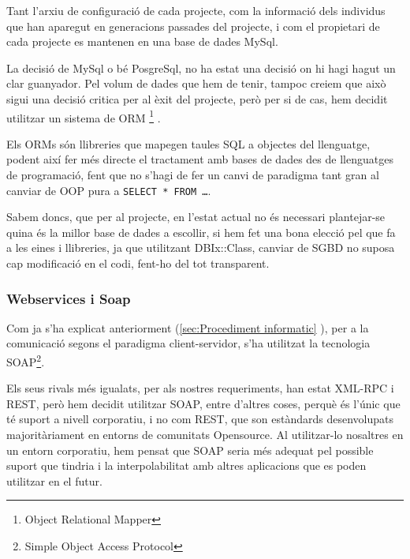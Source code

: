 Tant l'arxiu de configuració de cada projecte, com la informació dels individus
que han aparegut en generacions passades del projecte, i com el propietari de
cada projecte es mantenen en una base de dades MySql.

La decisió de MySql o bé PosgreSql, no ha estat una decisió on hi hagi hagut un
clar guanyador.  Pel volum de dades que hem de tenir, tampoc creiem que això
sigui una decisió critica per al èxit del projecte, però per si de cas, hem
decidit utilitzar un sistema de ORM \footnote{Object Relational Mapper} .

Els ORMs són llibreries que mapegen taules SQL a objectes del llenguatge, podent
així fer més directe el tractament amb bases de dades des de llenguatges de
programació, fent que no s'hagi de fer un canvi de paradigma tant gran al
canviar de OOP pura a \texttt{SELECT * FROM \ldots}.

Sabem doncs, que per al projecte, en l'estat actual no és necessari plantejar-se
quina és la millor base de dades a escollir, si hem fet una bona elecció pel
que fa a les eines i llibreries, ja que utilitzant DBIx::Class, canviar de SGBD no
suposa cap modificació en el codi, fent-ho del tot transparent.


\subsubsection{Webservices i Soap} %
\label{ssub:WS i Soap}

Com ja s'ha explicat anteriorment (\ref{sec:Procediment informatic} ), per a la
comunicació segons el paradigma client-servidor, s'ha utilitzat la tecnologia
SOAP\footnote{Simple Object Access Protocol}.

Els seus rivals més igualats, per als nostres requeriments, han estat XML-RPC i
REST, però hem decidit utilitzar SOAP, entre d'altres coses, perquè és l'únic
que té suport a nivell corporatiu, i no com REST, que son estàndards
desenvolupats majoritàriament en entorns de comunitats Opensource.  Al
utilitzar-lo nosaltres en un entorn corporatiu, hem pensat que SOAP seria més
adequat pel possible suport que tindria i la interpolabilitat amb altres
aplicacions que es poden utilitzar en el futur.


